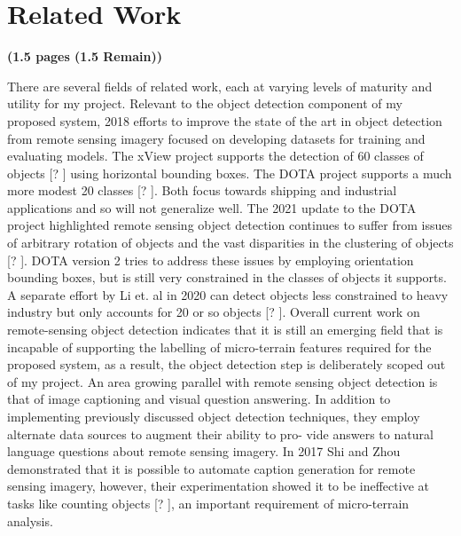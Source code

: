 \section{Related Work}
\label{section:related}
\textbf{(1.5 pages (1.5 Remain))}




There are several fields of related work, each at varying levels of maturity and utility for my project. 
Relevant to the object detection component of my proposed system, 2018 efforts to improve the state of the art in object detection from remote sensing imagery focused on developing datasets for training and evaluating models. 
The xView project supports the detection of 60 classes of objects [? ] using horizontal bounding boxes. The DOTA project supports a much more modest 20 classes [? ]. 
Both focus towards shipping and industrial applications and so will not generalize well. The 2021 update to the DOTA project highlighted remote sensing object detection continues to suffer from issues of arbitrary rotation of objects and the vast disparities in the clustering of objects [? ]. 
DOTA version 2 tries to address these issues by employing orientation bounding boxes, but is still very constrained in the classes of objects it supports. 
A separate effort by Li et. al in 2020 can detect objects less constrained to heavy industry but only accounts for 20 or so objects [? ]. 
Overall current work on remote-sensing object detection indicates that it is still an emerging field that is incapable of supporting the labelling of micro-terrain features required for the proposed system, as a result, the object detection step is deliberately scoped out of my project.
An area growing parallel with remote sensing object detection is that of image captioning and visual question answering. 
In addition to implementing previously discussed object detection techniques, they employ alternate data sources to augment their ability to pro- vide answers to natural language questions about remote sensing imagery. 
In 2017 Shi and Zhou demonstrated that it is possible to automate caption generation for remote sensing imagery, however, their experimentation showed it to be ineffective at tasks like counting objects [? ], an important requirement of micro-terrain analysis.

